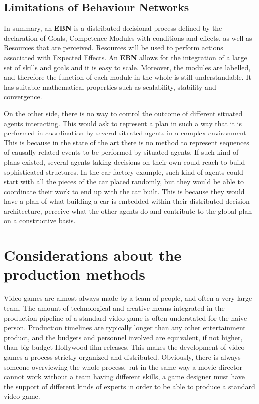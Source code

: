 \documentclass[
		twoside,openright,titlepage,numbers=noenddot,manychapters,
		headinclude,%
                footinclude=false,cleardoublepage=empty,
                BCOR=5mm,
		fontsize=11pt, %
                 enabledeprecatedfontcommands]{scrreprt}
\begin{document}
\subsection{Limitations of Behaviour Networks}
In summary, an \textbf{EBN} is a distributed decisional process defined by the declaration of Goals, Competence Modules with conditions and effects, as well as Resources that are perceived. Resources will be used to perform actions associated with Expected Effects. %
An \textbf{EBN} allows for the integration of a large set of skills and goals and it is easy to scale. Moreover, the modules are labelled, and therefore the function of each module in the whole is still understandable. It has suitable mathematical properties such as scalability, stability and convergence. 

On the other side,  there is no way to control the outcome of different situated agents interacting. This would ask to represent a plan in such a way that it is performed in coordination by several situated agents in a complex environment. %
This is because in the state of the art there is no method to represent sequences of causally related events to be performed by situated agents.
If such kind of plans existed, several agents taking decisions on their own could reach to build sophisticated structures. In the car factory example, such kind of agents could start with all the pieces of the car placed randomly, but they would be able to coordinate their work to end up with the car built. This is because they would have a plan of what building a car is embedded within their distributed decision architecture, perceive what the other agents do and contribute to the global plan on a constructive basis. 


\section{Considerations about the production methods}
\label{sec_prod}
Video-games are almost always made by a team of people, and often a very large team. The amount of technological and creative means integrated in the production pipeline of a standard video-game is often understated for the naive person. Production timelines are typically longer than any other entertainment product, and the budgets and personnel involved are equivalent, if not higher, than big budget Hollywood film releases.
This makes the development of video-games a process strictly organized and distributed. Obviously, there is always someone overviewing the whole process, but in the same way a movie director cannot work without a team having different skills, a game designer must have the support of different kinds of experts in order to be able to produce a standard video-game.
\end{document}
